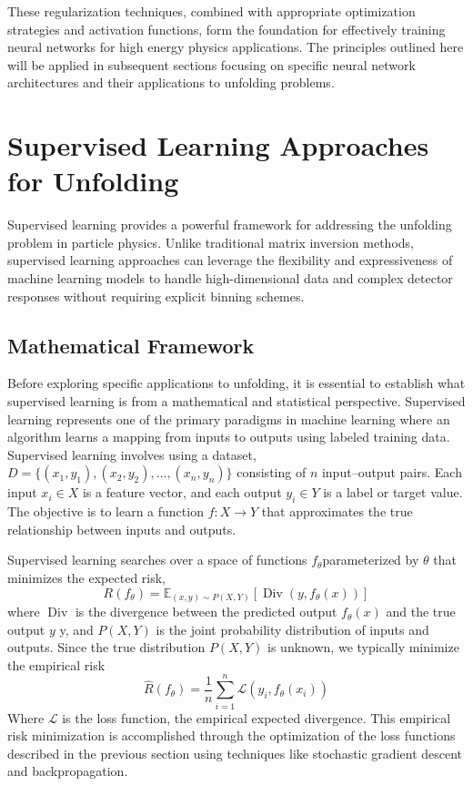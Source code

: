         These regularization techniques, combined with appropriate optimization strategies and activation functions, form the foundation for effectively training neural networks for high energy physics applications.
        The principles outlined here will be applied in subsequent sections focusing on specific neural network architectures and their applications to unfolding problems.
\section{Supervised Learning Approaches for Unfolding}
    Supervised learning provides a powerful framework for addressing the unfolding problem in particle physics. 
    Unlike traditional matrix inversion methods, supervised learning approaches can leverage the flexibility and expressiveness of machine learning models to handle high-dimensional data and complex detector responses without requiring explicit binning schemes.
    \subsection{Mathematical Framework}
        Before exploring specific applications to unfolding, it is essential to establish what supervised learning is from a mathematical and statistical perspective.
        Supervised learning represents one of the primary paradigms in machine learning where an algorithm learns a mapping from inputs to outputs using labeled training data.
        Supervised learning involves using a dataset, \({D} = \{(x_1, y_1), (x_2, y_2), \ldots, (x_n, y_n)\}\) consisting of \(n\) input--output pairs.
        Each input \(x_i \in {X}\) is a feature vector, and each output \(y_i \in {Y}\) is a label or target value.
        The objective is to learn a function \(f: {X} \rightarrow {Y}\) that approximates the true relationship between inputs and outputs.
    
        Supervised learning searches over a space of functions \(f_\theta\)parameterized by \(\theta\) that minimizes the expected risk,
        \begin{equation}
            {R}(f_\theta) = \mathbb{E}_{(x,y) \sim P(X,Y)}[\operatorname{Div}(y, f_\theta(x))]
        \end{equation}
        where \(\operatorname{Div}\) is the divergence between the predicted output \(f_\theta(x)\) and the true output \(y\) y, and \(P(X,Y)\) is the joint probability distribution of inputs and outputs.
        Since the true distribution \(P(X,Y)\) is unknown, we typically minimize the empirical risk
        \begin{equation}
        \hat{{R}}(f_\theta) = \frac{1}{n}\sum_{i=1}^{n}\mathcal{L}(y_i, f_\theta(x_i))
        \end{equation}
        Where \(\mathcal{L}\) is the loss function, the empirical expected divergence.
        This empirical risk minimization is accomplished through the optimization of the loss functions described in the previous section using techniques like stochastic gradient descent and backpropagation.
